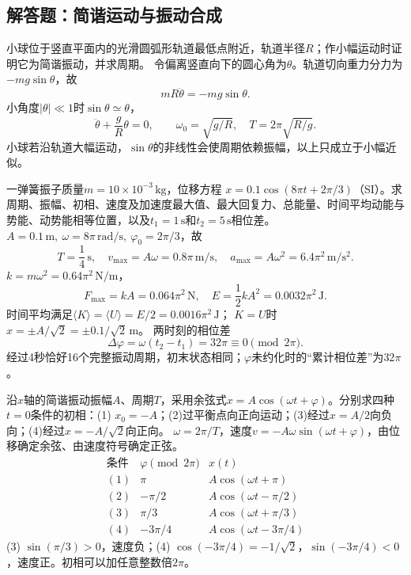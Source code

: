 \subsection{解答题：简谐运动与振动合成}

\problemtext 小球位于竖直平面内的光滑圆弧形轨道最低点附近，轨道半径$R$；作小幅运动时证明它为简谐振动，并求周期。
\workings
令偏离竖直向下的圆心角为$\theta$。轨道切向重力分力为$-mg\sin\theta$，故
\[
mR\ddot\theta=-mg\sin\theta.
\]
小角度$|\theta|\ll1$时$\sin\theta\simeq\theta$，
\[
\ddot\theta+\frac gR\theta=0,\qquad
\boxed{\omega_0=\sqrt{g/R}},\quad
\boxed{T=2\pi\sqrt{R/g}}.
\]
\crosscheck 小球若沿轨道大幅运动，$\sin\theta$的非线性会使周期依赖振幅，以上只成立于小幅近似。

\problemtext 一弹簧振子质量$m=10\times10^{-3}\,\mathrm{kg}$，位移方程
$x=0.1\cos(8\pi t+2\pi/3)$（SI）。求周期、振幅、初相、速度及加速度最大值、最大回复力、总能量、时间平均动能与势能、动势能相等位置，以及$t_1=1\,\mathrm s$和$t_2=5\,\mathrm s$相位差。
\workings
$A=0.1\,\mathrm m,\ \omega=8\pi\,\mathrm{rad/s},\
\varphi_0=2\pi/3$，故
\[
\boxed{T=\frac14\,\mathrm s},\quad
\boxed{v_{\max}=A\omega=0.8\pi\,\mathrm{m/s}},\quad
\boxed{a_{\max}=A\omega^2=6.4\pi^2\,\mathrm{m/s^2}}.
\]
$k=m\omega^2=0.64\pi^2\,\mathrm{N/m}$，
\[
\boxed{F_{\max}=kA=0.064\pi^2\,\mathrm N},\quad
\boxed{E=\frac12kA^2=0.0032\pi^2\,\mathrm J}.
\]
时间平均满足$\langle K\rangle=\langle U\rangle=E/2=0.0016\pi^2\,\mathrm J$；
$K=U$时$x=\pm A/\sqrt2=\pm0.1/\sqrt2\,\mathrm m$。
两时刻的相位差
\[
\boxed{\Delta\varphi=\omega(t_2-t_1)=32\pi
\equiv0\pmod{2\pi}}.
\]
\crosscheck 经过4秒恰好16个完整振动周期，初末状态相同；$\varphi$未约化时的“累计相位差”为$32\pi$。

\problemtext 沿$x$轴的简谐振动振幅$A$、周期$T$，采用余弦式$x=A\cos(\omega t+\varphi)$。分别求四种$t=0$条件的初相：(1) $x_0=-A$；(2)过平衡点向正向运动；(3)经过$x=A/2$向负向；(4)经过$x=-A/\sqrt2$向正向。
\workings
$\omega=2\pi/T$，速度$v=-A\omega\sin(\omega t+\varphi)$，由位移确定余弦、由速度符号确定正弦。
\[
\begin{array}{c|c|l}
\text{条件}&\varphi\pmod{2\pi}&x(t)\\ \hline
(1)&\pi&A\cos(\omega t+\pi)\\
(2)&-\pi/2&A\cos(\omega t-\pi/2)\\
(3)&\pi/3&A\cos(\omega t+\pi/3)\\
(4)&-3\pi/4&A\cos(\omega t-3\pi/4)
\end{array}
\]
\crosscheck (3) $\sin(\pi/3)>0$，速度负；(4) $\cos(-3\pi/4)=-1/\sqrt2$，$\sin(-3\pi/4)<0$，速度正。初相可以加任意整数倍$2\pi$。


